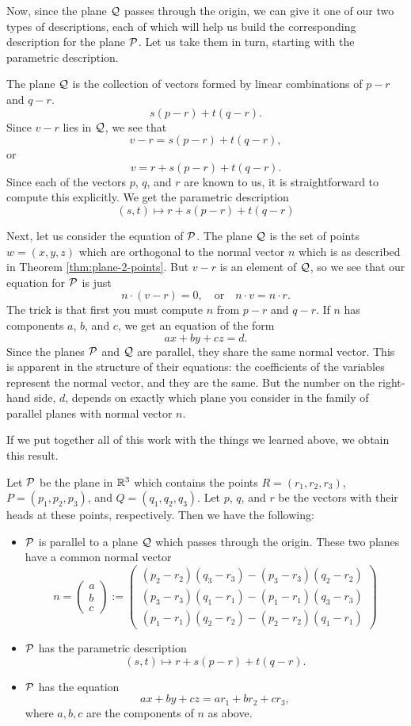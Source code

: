 \documentclass[00-livre-main.tex]{subfiles}
\begin{document}
Now, since the plane $\mathcal{Q}$ passes through the origin, we can give it one of our two types of descriptions, each of which will help us build the corresponding description for the plane $\mathcal{P}$. Let us take them in turn, starting with the
parametric description. 


The plane $\mathcal{Q}$ is the collection of vectors formed by linear combinations of $p-r$ and $q-r$.
\[
s (p-r) + t (q-r).
\] 
Since $v-r$ lies in $\mathcal{Q}$, we see that
\[
v-r = s(p-r) + t (q-r),
\]
or 
\[
v = r + s(p-r) + t (q-r).
\]
Since each of the vectors $p$, $q$, and $r$ are known to us, it is straightforward to compute this explicitly. We get the parametric description
\[
(s,t) \mapsto r + s(p-r) + t (q-r)
\]



Next, let us consider the equation of $\mathcal{P}$.
The plane $\mathcal{Q}$ is the set of points $w=(x,y,z)$ which are orthogonal to the normal vector $n$ which is as described in Theorem \ref{thm:plane-2-points}.
But $v-r$ is an element of $\mathcal{Q}$, so we see that our equation for $\mathcal{P}$ is just
\[
n \cdot (v-r) = 0, \quad \text{or} \quad n\cdot v = n \cdot r.
\]
The trick is that first you must compute $n$ from $p-r$ and $q-r$. If $n$ has components $a$, $b$, and $c$, we get an equation of the form 
\[
ax+by+cz = d.
\]
Since the planes $\mathcal{P}$ and $\mathcal{Q}$ are parallel, they share the same normal vector. This is apparent in the structure of their equations: the coefficients of the variables represent the normal vector, and they are the same. But the number on the right-hand side, $d$, depends on exactly which plane you consider in the family of parallel planes with normal vector $n$.

If we put together all of this work with the things we learned above, we obtain this result.

\begin{theorem}
Let $\mathcal{P}$ be the plane in $\mathbb{R}^3$ which contains the points $R = (r_1, r_2, r_3)$, $P=(p_1,p_2,p_3)$, and $Q=(q_1,q_2,q_3)$. Let $p$, $q$, and $r$ be the vectors with their heads at these points, respectively. Then we have the following:
\begin{itemize}
\item $\mathcal{P}$ is parallel to a plane $\mathcal{Q}$ which passes through the origin. These two planes have a common normal vector
\[
n = \begin{pmatrix} a \\ b \\ c \end{pmatrix} := 
\begin{pmatrix} (p_2-r_2)( q_3-r_3) - (p_3 -r_3)(q_2-r_2) \\
(p_3-r_3)(q_1-r_1) - (p_1-r_1)( q_3-r_3) \\ (p_1-r_1)(q_2-r_2) - (p_2-r_2) (q_1-r_1) \end{pmatrix}
\]

\item $\mathcal{P}$ has the parametric description
\[
(s,t) \mapsto r + s (p-r) + t(q-r).
\]

\item $\mathcal{P}$ has the equation
\[
ax + by +cz = ar_1 + br_2 + cr_3,
\]
where $a, b, c$ are the components of $n$ as above.
\end{itemize}
\end{theorem}
\end{document}
